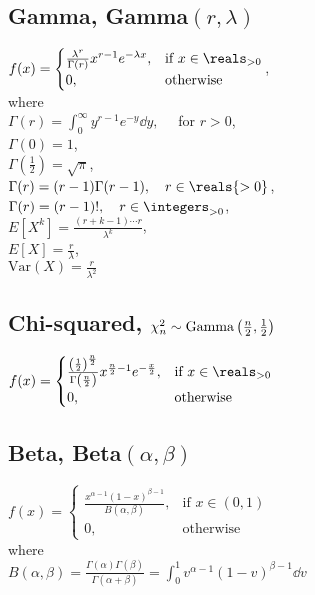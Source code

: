 \subsection*{Gamma, \textnormal{Gamma}\((r, \lambda)\)}
\(
  f(x) =
  \begin{cases}
    \frac{\lambda^r}{\Gamma(r)} x^{r-1} e^{-\lambda x},
    & \text{if } x \in \reals_{>0}\\
    0,
    & \text{otherwise}
  \end{cases}
\),\\
where\\
\(\Gamma(r) = \int_0^\infty y^{r-1}e^{-y} \dd{y}, \quad\) for \(r > 0\),\\
\(\Gamma(0) = 1\),\\
\(\Gamma(\frac{1}{2}) = \sqrt{\pi}\),\\
\(\Gamma(r) = (r-1)\Gamma(r-1), \quad r \in \reals{>0}\),\\
\(\Gamma(r) = (r-1)!, \quad r \in \integers_{>0}\),\\
\(E[X^k] = \frac{(r+k-1) \dotsm r}{\lambda^k}\),\\
\(E[X] = \frac{r}{\lambda}\),\\
\(\text{Var}(X) = \frac{r}{\lambda^2}\)

\subsection*{Chi-squared,
\(\chi_n^2 \sim \textnormal{Gamma}\left(\frac{n}{2}, \frac{1}{2}\right)\)}
\(
  f(x) =
  \begin{cases}
    \frac{\left(\frac{1}{2}\right)^{\frac{n}{2}}}{\Gamma\left(\frac{n}{2}\right)}
      x^{\frac{n}{2}-1} e^{-\frac{x}{2}},
    & \text{if } x \in \reals_{>0}\\
    0, & \text{otherwise}
  \end{cases}
\)

\subsection*{Beta, \textnormal{Beta}\((\alpha, \beta)\)}
\(
  f(x) =
  \begin{cases}
    \frac{x^{\alpha-1} (1-x)^{\beta-1}}{B(\alpha, \beta)},
    & \text{if } x \in (0, 1)\\
    0, & \text{otherwise}
  \end{cases}
\)\\
where\\
\(
  B(\alpha, \beta) = \frac{\Gamma(\alpha)\Gamma(\beta)}{\Gamma(\alpha + \beta)}
  = \int_0^1 v^{\alpha-1}(1-v)^{\beta-1} \dd{v}
\)

